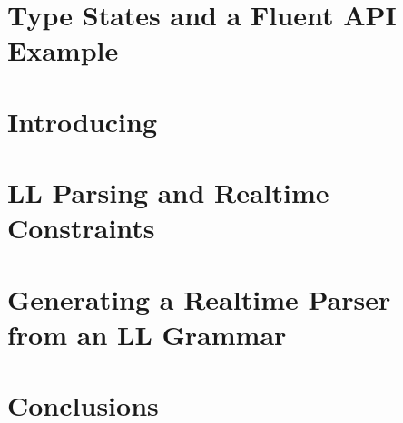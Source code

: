 \documentclass[nonatbib,preprint,numbers]{sigplanconf}
\begin{document}
\section{Type States and a Fluent API Example}
\label{section:example}


\section{Introducing \Fajita}
\label{section:fajita}


\section{LL Parsing and Realtime Constraints}
\label{section:intuition}


\section{Generating a Realtime Parser \\ from an LL Grammar}
\label{section:algorithm}


\section{Conclusions}
\label{section:zz}


\small

\end{document}
